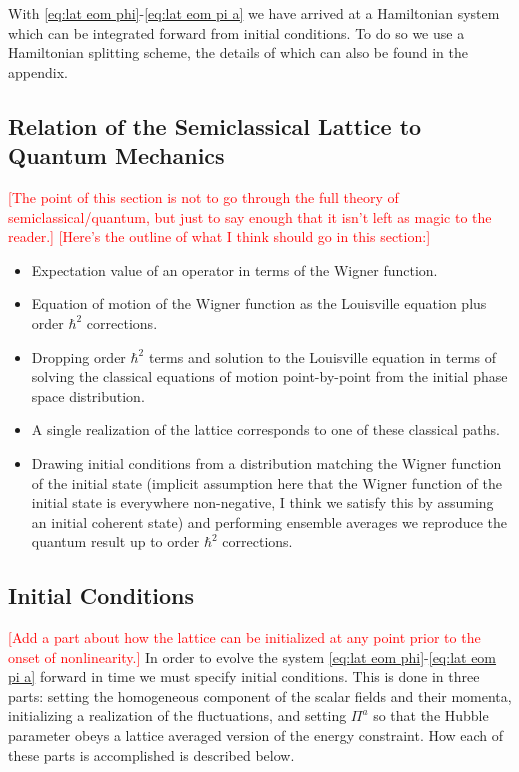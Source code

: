 With \eqref{eq:lat eom phi}-\eqref{eq:lat eom pi a} we have arrived at a Hamiltonian system which can be integrated forward from initial conditions. To do so we use a Hamiltonian splitting scheme, the details of which can also be found in the appendix.

\subsection{Relation of the Semiclassical Lattice to Quantum Mechanics}
\textcolor{red}{[The point of this section is not to go through the full theory of semiclassical/quantum, but just to say enough that it isn't left as magic to the reader.]}
\textcolor{red}{[Here's the outline of what I think should go in this section:]}
\begin{itemize}
  \color{red}
  \item Expectation value of an operator in terms of the Wigner function.
  \item Equation of motion of the Wigner function as the Louisville equation plus order $\hbar^2$ corrections.
  \item Dropping order $\hbar^2$ terms and solution to the Louisville equation in terms of solving the classical equations of motion point-by-point from the initial phase space distribution.
  \item A single realization of the lattice corresponds to one of these classical paths.
  \item Drawing initial conditions from a distribution matching the Wigner function of the initial state (implicit assumption here that the Wigner function of the initial state is everywhere non-negative, I think we satisfy this by assuming an initial coherent state) and performing ensemble averages we reproduce the quantum result up to order $\hbar^2$ corrections.
\end{itemize}
  
\subsection{Initial Conditions} \label{sec:ICs}
\textcolor{red}{[Add a part about how the lattice can be initialized at any point prior to the onset of nonlinearity.]}
In order to evolve the system \eqref{eq:lat eom phi}-\eqref{eq:lat eom pi a} forward in time we must specify initial conditions. This is done in three parts: setting the homogeneous component of the scalar fields and their momenta, initializing a realization of the fluctuations, and setting $\Pi^a$ so that the Hubble parameter obeys a lattice averaged version of the energy constraint. How each of these parts is accomplished is described below.

